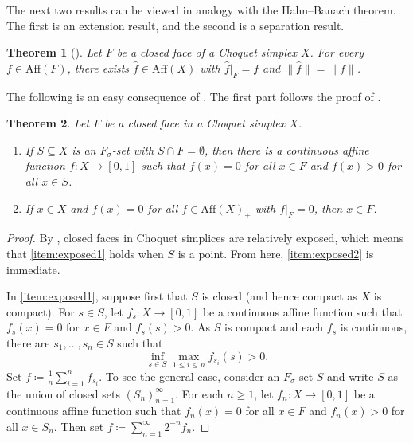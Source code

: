 \documentclass[a4paper,11pt]{amsart}
\newtheorem{theorem}{Theorem}
\theoremstyle{definition}
\numberwithin{equation}{section}
\numberwithin{theorem}{section}
\begin{document}
The next two results can be viewed in analogy with the Hahn--Banach theorem.  The first is an extension result, and the second is a separation result.

\begin{theorem}[{\cite[Theorem~II.5.19]{Alf71}}]\label{thm:extending-affine}
	Let $F$ be a closed face of a Choquet simplex $X$.
	For every $f \in \mathrm{Aff}(F)$, there exists $\hat{f} \in \mathrm{Aff}(X)$ with $\hat{f}|_F = f$ and $\|\hat{f}\| = \|f\|$. 
\end{theorem}

The following is an easy consequence of \cite[Corollary~II.5.20]{Alf71}.  The first part follows the proof of \cite[Proposition~II.5.16]{Alf71}.

\begin{theorem}\label{thm:exposed}
	Let $F$ be a closed face in a Choquet simplex $X$.
	\begin{enumerate}
		\item\label{item:exposed1} If $S \subseteq X$ is an $F_\sigma$-set with $S \cap F = \emptyset$, then there is a continuous affine function $f \colon X \rightarrow [0, 1]$ such that $f(x) = 0$ for all $x \in F$ and $f(x) > 0$ for all $x \in S$.
		\item\label{item:exposed2} If $x \in X$ and $f(x) = 0$ for all $f \in \mathrm{Aff}(X)_+$ with $f|_F = 0$, then $x \in F$.
	\end{enumerate}
\end{theorem}


\begin{proof}
	By \cite[Corollary~II.5.20]{Alf71}, closed faces in Choquet simplices are relatively exposed, which means that \ref{item:exposed1} holds when $S$ is a point.  From here, \ref{item:exposed2} is immediate.
	
	In \ref{item:exposed1}, suppose first that $S$ is closed (and hence compact as $X$ is compact).  For $s \in S$, let $f_s \colon X \rightarrow [0, 1]$ be a continuous affine function such that $f_s(x) = 0$ for $x \in F$ and $f_s(s) > 0$.  As $S$ is compact and each $f_s$ is continuous, there are $s_1, \ldots, s_n \in S$ such that
	\begin{equation}
		\inf_{s \in S} \max_{1 \leq i \leq n} f_{s_i}(s) > 0.
	\end{equation}
	Set $f \coloneqq \frac1n \sum_{i = 1}^n f_{s_i}$.  To see the general case, consider an $F_\sigma$-set $S$ and write $S$ as the union of closed sets $(S_n)_{n=1}^\infty$.  For each $n \geq 1$, let $f_n \colon X \rightarrow [0, 1]$ be a continuous affine function such that $f_n(x) = 0$ for all $x\in F$ and $f_n(x) > 0$ for all $x \in S_n$.  Then set $f \coloneqq \sum_{n=1}^\infty 2^{-n} f_n$.
\end{proof}
\end{document}
